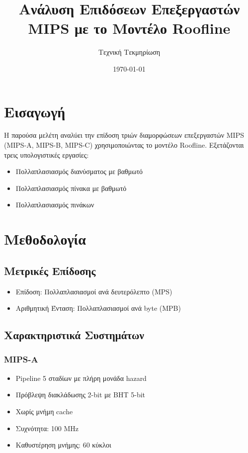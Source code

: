 \documentclass[11pt,a4paper]{article}
\title{Ανάλυση Επιδόσεων Επεξεργαστών MIPS με το Μοντέλο Roofline}
\author{Τεχνική Τεκμηρίωση}
\date{\today}
\begin{document}
\maketitle

\section{Εισαγωγή}
Η παρούσα μελέτη αναλύει την επίδοση τριών διαμορφώσεων επεξεργαστών MIPS (MIPS-A, MIPS-B, MIPS-C) χρησιμοποιώντας το μοντέλο Roofline. Εξετάζονται τρεις υπολογιστικές εργασίες:
\begin{itemize}
    \item Πολλαπλασιασμός διανύσματος με βαθμωτό
    \item Πολλαπλασιασμός πίνακα με βαθμωτό
    \item Πολλαπλασιασμός πινάκων
\end{itemize}

\section{Μεθοδολογία}
\subsection{Μετρικές Επίδοσης}
\begin{itemize}
    \item Επίδοση: Πολλαπλασιασμοί ανά δευτερόλεπτο (MPS)
    \item Αριθμητική Ένταση: Πολλαπλασιασμοί ανά byte (MPB)
\end{itemize}

\subsection{Χαρακτηριστικά Συστημάτων}
\subsubsection{MIPS-A}
\begin{itemize}
    \item Pipeline 5 σταδίων με πλήρη μονάδα hazard
    \item Πρόβλεψη διακλάδωσης 2-bit με BHT 5-bit
    \item Χωρίς μνήμη cache
    \item Συχνότητα: 100 MHz
    \item Καθυστέρηση μνήμης: 60 κύκλοι
\end{itemize}
\end{document}
